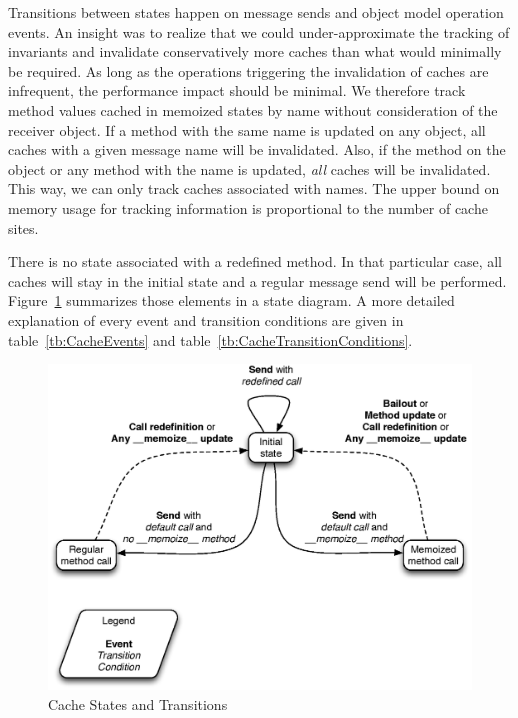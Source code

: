 Transitions between states happen on message sends and object model operation
events.  An insight was to realize that we could under-approximate the tracking
of invariants and invalidate conservatively more caches than what would
minimally be required. As long as the operations triggering the invalidation of
caches are infrequent, the performance impact should be minimal. We therefore
track method values cached in memoized states by name without consideration of
the receiver object. If a method with the same name is updated on any object,
all caches with a given message name will be invalidated. Also, if the
 method on the  object or any method with the
 name is updated, \textit{all} caches will be invalidated. This
way, we can only track caches associated with names. The upper bound on memory
usage for tracking information is proportional to the number of cache sites.

There is no state associated with a redefined  method. In that
particular case, all caches will stay in the initial state and a regular
message send will be performed. Figure~\ref{fig:CacheStates}
summarizes those elements in a state diagram. A more detailed explanation of
every event and transition conditions are given in table~\ref{tb:CacheEvents}
and table~\ref{tb:CacheTransitionConditions}.

\begin{figure}[htb]
\begin{center}
\includegraphics[width=\textwidth]{figures/cacheStates}
\caption{\label{fig:CacheStates} Cache States and Transitions}
\end{center}
\end{figure}

